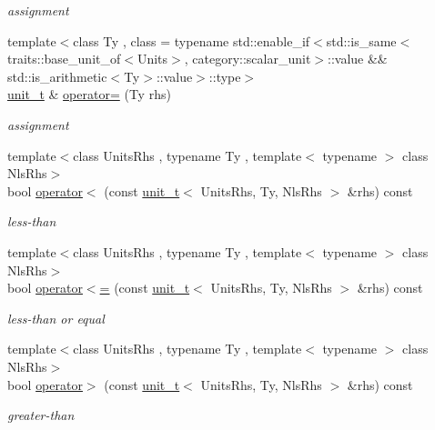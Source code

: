 \begin{DoxyCompactItemize}
\begin{DoxyCompactList}\small\item\em assignment \end{DoxyCompactList}\item 
{\footnotesize template$<$class Ty , class  = typename std\+::enable\+\_\+if$<$std\+::is\+\_\+same$<$traits\+::base\+\_\+unit\+\_\+of$<$\+Units$>$, category\+::scalar\+\_\+unit$>$\+::value \&\& std\+::is\+\_\+arithmetic$<$\+Ty$>$\+::value$>$\+::type$>$ }\\\hyperlink{classunits_1_1unit__t}{unit\+\_\+t} \& \hyperlink{classunits_1_1unit__t_a8719ce4da20bef60f02bc7014fec462f}{operator=} (Ty rhs)
\begin{DoxyCompactList}\small\item\em assignment \end{DoxyCompactList}\item 
{\footnotesize template$<$class Units\+Rhs , typename Ty , template$<$ typename $>$ class Nls\+Rhs$>$ }\\bool \hyperlink{classunits_1_1unit__t_a246440e86277356cd105f9052782fc88}{operator$<$} (const \hyperlink{classunits_1_1unit__t}{unit\+\_\+t}$<$ Units\+Rhs, Ty, Nls\+Rhs $>$ \&rhs) const 
\begin{DoxyCompactList}\small\item\em less-\/than \end{DoxyCompactList}\item 
{\footnotesize template$<$class Units\+Rhs , typename Ty , template$<$ typename $>$ class Nls\+Rhs$>$ }\\bool \hyperlink{classunits_1_1unit__t_a503fdec1595b8d546eb21f8316d6cba7}{operator$<$=} (const \hyperlink{classunits_1_1unit__t}{unit\+\_\+t}$<$ Units\+Rhs, Ty, Nls\+Rhs $>$ \&rhs) const 
\begin{DoxyCompactList}\small\item\em less-\/than or equal \end{DoxyCompactList}\item 
{\footnotesize template$<$class Units\+Rhs , typename Ty , template$<$ typename $>$ class Nls\+Rhs$>$ }\\bool \hyperlink{classunits_1_1unit__t_affcb90859d439607fd1d7d95405d0e33}{operator$>$} (const \hyperlink{classunits_1_1unit__t}{unit\+\_\+t}$<$ Units\+Rhs, Ty, Nls\+Rhs $>$ \&rhs) const 
\begin{DoxyCompactList}\small\item\em greater-\/than \end{DoxyCompactList}\item 

\end{DoxyCompactItemize}
